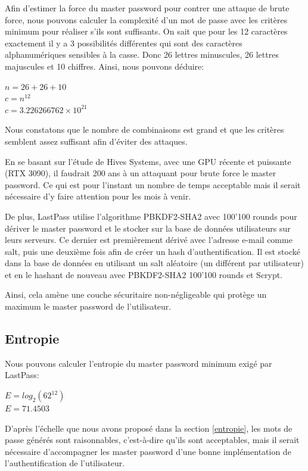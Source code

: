 Afin d'estimer la force du master password pour contrer une attaque de brute force, nous pouvons calculer la complexité d'un mot de passe avec les critères minimum pour réaliser s'ils sont suffisants. On sait que pour les 12 caractères exactement il y a 3 possibilités différentes qui sont des caractères alphanumériques sensibles à la casse. Donc 26 lettres minuscules, 26 lettres majuscules et 10 chiffres. Ainsi, nous pouvons déduire:

\begin{center}
$n = 26 + 26 + 10$ \\
$c = n^{12}$ \\
$c = 3.226266762 \times 10^{21}$ \\
\end{center}

Nous constatons que le nombre de combinaisons est grand et que les critères semblent assez suffisant afin d'éviter des attaques. 

En se basant sur l'étude de Hives Systems\cite{hives}, avec une GPU récente et puissante (RTX 3090), il faudrait 200 ans à un attaquant pour brute force le master password. Ce qui est pour l'instant un nombre de temps acceptable mais il serait nécessaire d'y faire attention pour les mois à venir.

De plus, LastPass utilise l'algorithme PBKDF2-SHA2 avec 100'100 rounds pour dériver le master password et le stocker sur la base de données utilisateurs sur leurs serveurs. Ce dernier est premièrement dérivé avec l'adresse e-mail comme salt, puis une deuxième fois afin de créer un hash d'authentification. Il est stocké dans la base de données en utilisant un salt aléatoire (un différent par utilisateur) et en le hashant de nouveau avec PBKDF2-SHA2 100'100 rounds et Scrypt.

Ainsi, cela amène une couche sécuritaire non-négligeable qui protège un maximum le master password de l'utilisateur. 

\subsection{Entropie}
Nous pouvons calculer l'entropie du master password minimum exigé par LastPass:

\begin{center}
	$E = log_2(62^{12})$ \\
	$E = 71.4503$
\end{center}

D'après l'échelle que nous avons proposé dans la section \ref{entropie}, les mots de passe générés sont raisonnables, c'est-à-dire qu'ils sont acceptables, mais il serait nécessaire d'accompagner les master password d'une bonne implémentation de l'authentification de l'utilisateur.

